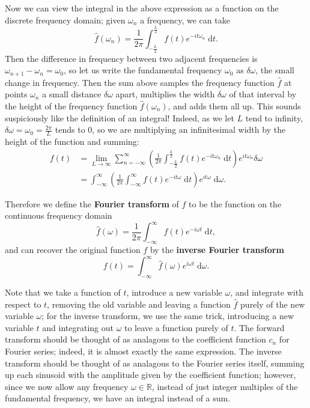 \documentclass{article}
\newcommand{\diff}{\;\mathrm{d}}
\begin{document}
Now we can view the integral in the above expression as a function on the discrete frequency domain; given $\omega_n$ a frequency, we can take
\[\hat{f}(\omega_n)=\frac{1}{2\pi}\int_{-\frac{L}{2}}^{\frac{L}{2}} f(t)e^{-it\omega_n}\diff t.\]
Then the difference in frequency between two adjacent frequencies is $\omega_{n+1}-\omega_n = \omega_0$, so let us write the fundamental frequency $\omega_0$ as $\delta\omega$, the small change in frequency. Then the sum above samples the frequency function $\hat{f}$ at points $\omega_n$ a small distance $\delta\omega$ apart, multiplies the width $\delta\omega$ of that interval by the height of the frequency function $\hat{f}(\omega_n)$, and adds them all up. This sounds suspiciously like the definition of an integral! Indeed, as we let $L$ tend to infinity, $\delta\omega=\omega_0=\frac{2\pi}{L}$ tends to 0, so we are multiplying an infinitesimal width by the height of the function and summing:
\begin{align*}
	f(t)&=\lim_{L\to \infty}\sum_{n=-\infty}^\infty \left(\frac{1}{2\pi}\int_{-\frac{L}{2}}^{\frac{L}{2}} f(t) e^{-it\omega_n}\diff t \right) e^{it\omega_n}\delta\omega\\
	&=\int_{-\infty}^\infty \left(\frac{1}{2\pi}\int_{-\infty}^\infty f(t)e^{-it\omega}\diff t\right) e^{it\omega}\diff \omega.
\end{align*}


Therefore we define the \textbf{Fourier transform} of $f$ to be the function on the continuous frequency domain
\[\hat{f}(\omega)=\frac{1}{2\pi}\int_{-\infty}^\infty f(t)e^{-i\omega t}\diff t,\]
and can recover the original function $f$ by the \textbf{inverse Fourier transform}
\[f(t)=\int_{-\infty}^\infty \hat{f}(\omega)e^{i\omega t}\diff \omega.\]

Note that we take a function of $t$, introduce a new variable $\omega$, and integrate with respect to $t$, removing the old variable and leaving a function $\hat{f}$ purely of the new variable $\omega$; for the inverse transform, we use the same trick, introducing a new variable $t$ and integrating out $\omega$ to leave a function purely of $t$. The forward transform should be thought of as analagous to the coefficient function $c_n$ for Fourier series; indeed, it is almost exactly the same expression. The inverse transform should be thought of as analagous to the Fourier series itself, summing up each sinusoid with the amplitude given by the coefficient function; however, since we now allow any frequency $\omega\in \mathbb{R}$, instead of just integer multiples of the fundamental frequency, we have an integral instead of a sum.\medskip
\end{document}
